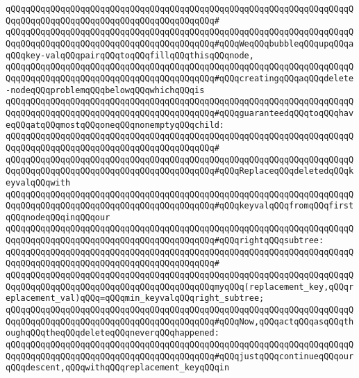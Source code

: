 \verb|qQQqqQQqqQQqqQQqqQQqqQQqqQQqqQQqqQQqqQQqqQQqqQQqqQQqqQQqqQQqqQQqqQQqqQQqqQQqqQQqqQQqqQQqqQQqqQQqqQQqqQQqqQQqqQQq#|\newline
\verb|qQQqqQQqqQQqqQQqqQQqqQQqqQQqqQQqqQQqqQQqqQQqqQQqqQQqqQQqqQQqqQQqqQQqqQQqqQQqqQQqqQQqqQQqqQQqqQQqqQQqqQQqqQQqqQQq#qQQqWeqQQqbubbleqQQqupqQQqaqQQqkey-valqQQqpairqQQqtoqQQqfillqQQqthisqQQqnode,|\newline
\verb|qQQqqQQqqQQqqQQqqQQqqQQqqQQqqQQqqQQqqQQqqQQqqQQqqQQqqQQqqQQqqQQqqQQqqQQqqQQqqQQqqQQqqQQqqQQqqQQqqQQqqQQqqQQqqQQq#qQQqcreatingqQQqaqQQqdelete-nodeqQQqproblemqQQqbelowqQQqwhichqQQqis|\newline
\verb|qQQqqQQqqQQqqQQqqQQqqQQqqQQqqQQqqQQqqQQqqQQqqQQqqQQqqQQqqQQqqQQqqQQqqQQqqQQqqQQqqQQqqQQqqQQqqQQqqQQqqQQqqQQqqQQq#qQQqguaranteedqQQqtoqQQqhaveqQQqatqQQqmostqQQqoneqQQqnonemptyqQQqchild:|\newline
\verb|qQQqqQQqqQQqqQQqqQQqqQQqqQQqqQQqqQQqqQQqqQQqqQQqqQQqqQQqqQQqqQQqqQQqqQQqqQQqqQQqqQQqqQQqqQQqqQQqqQQqqQQqqQQqqQQq#|\newline
\newline
\verb|qQQqqQQqqQQqqQQqqQQqqQQqqQQqqQQqqQQqqQQqqQQqqQQqqQQqqQQqqQQqqQQqqQQqqQQqqQQqqQQqqQQqqQQqqQQqqQQqqQQqqQQqqQQqqQQq#qQQqReplaceqQQqdeletedqQQqkeyvalqQQqwith|\newline
\verb|qQQqqQQqqQQqqQQqqQQqqQQqqQQqqQQqqQQqqQQqqQQqqQQqqQQqqQQqqQQqqQQqqQQqqQQqqQQqqQQqqQQqqQQqqQQqqQQqqQQqqQQqqQQqqQQq#qQQqkeyvalqQQqfromqQQqfirstqQQqnodeqQQqinqQQqour|\newline
\verb|qQQqqQQqqQQqqQQqqQQqqQQqqQQqqQQqqQQqqQQqqQQqqQQqqQQqqQQqqQQqqQQqqQQqqQQqqQQqqQQqqQQqqQQqqQQqqQQqqQQqqQQqqQQqqQQq#qQQqrightqQQqsubtree:|\newline
\verb|qQQqqQQqqQQqqQQqqQQqqQQqqQQqqQQqqQQqqQQqqQQqqQQqqQQqqQQqqQQqqQQqqQQqqQQqqQQqqQQqqQQqqQQqqQQqqQQqqQQqqQQqqQQqqQQq#|\newline
\verb|qQQqqQQqqQQqqQQqqQQqqQQqqQQqqQQqqQQqqQQqqQQqqQQqqQQqqQQqqQQqqQQqqQQqqQQqqQQqqQQqqQQqqQQqqQQqqQQqqQQqqQQqqQQqqQQqmyqQQq(replacement_key,qQQqreplacement_val)qQQq=qQQqmin_keyvalqQQqright_subtree;|\newline
\newline
\verb|qQQqqQQqqQQqqQQqqQQqqQQqqQQqqQQqqQQqqQQqqQQqqQQqqQQqqQQqqQQqqQQqqQQqqQQqqQQqqQQqqQQqqQQqqQQqqQQqqQQqqQQqqQQqqQQq#qQQqNow,qQQqactqQQqasqQQqthoughqQQqtheqQQqdeleteqQQqneverqQQqhappened:|\newline
\verb|qQQqqQQqqQQqqQQqqQQqqQQqqQQqqQQqqQQqqQQqqQQqqQQqqQQqqQQqqQQqqQQqqQQqqQQqqQQqqQQqqQQqqQQqqQQqqQQqqQQqqQQqqQQqqQQq#qQQqjustqQQqcontinueqQQqourqQQqdescent,qQQqwithqQQqreplacement_keyqQQqin|\newline
